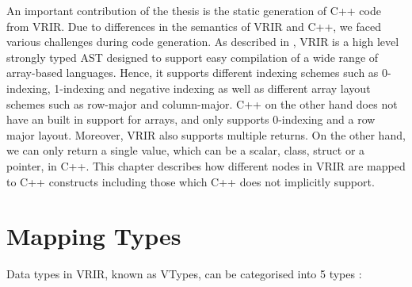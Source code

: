 An important contribution of the thesis is the static generation of C++ code from VRIR. Due to differences in the semantics of VRIR and C++, we faced various challenges during code generation. As described in , VRIR is a high level strongly typed AST designed to support easy compilation of a wide range of array-based languages. Hence, it supports different indexing schemes such as 0-indexing, 1-indexing and negative indexing as well as different array layout schemes such as row-major and column-major. C++ on the other hand does not have an built in support for arrays, and only supports 0-indexing and a row major layout. Moreover, VRIR also supports multiple returns. On the other hand, we can only return a single value, which can be a scalar, class, struct or a pointer, in C++. This chapter describes how different nodes in VRIR are mapped to C++ constructs including those which C++ does not implicitly support.
\section{Mapping Types}
Data types in VRIR, known as VTypes, can be categorised into 5 types :
